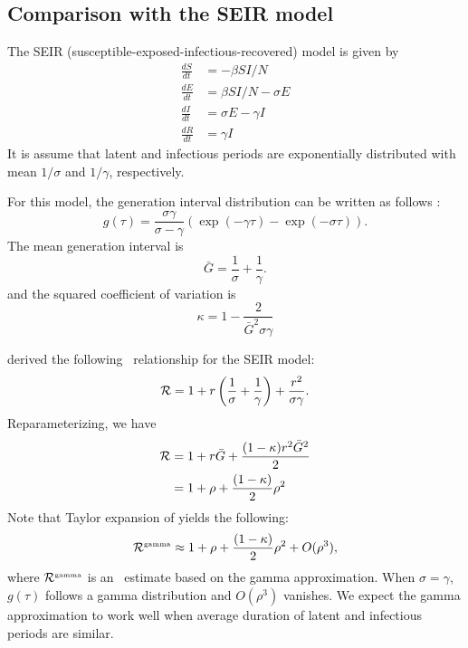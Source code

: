 
\subsection{Comparison with the SEIR model}

The SEIR (susceptible-exposed-infectious-recovered) model is given by
\begin{equation}
\begin{aligned}
\frac{dS}{dt} &= - \beta SI/N\\
\frac{dE}{dt} &= \beta SI/N - \sigma E\\
\frac{dI}{dt} &= \sigma E - \gamma I\\
\frac{dR}{dt} &= \gamma I
\end{aligned}
\end{equation}
It is assume that latent and infectious periods are exponentially distributed with mean $1/\sigma$ and $1/\gamma$, respectively.

For this model, the generation interval distribution can be written as follows \cite{Sven07}:
\begin{equation}
g({\tau}) = \frac{\sigma \gamma}{\sigma - \gamma} \left(\exp (-\gamma \tau) - \exp (- \sigma \tau) \right).
\end{equation}
The mean generation interval is
\begin{equation}
\bar{G} = \frac{1}{\sigma} + \frac{1}{\gamma}.
\end{equation}
and the squared coefficient of variation is
\begin{equation}
\kappa = 1 - \frac{2}{\bar{G}^2 \sigma \gamma}
\end{equation}

\cite{lipsitch2003transmission, roberts2007model} derived the following \rR\ relationship for the SEIR model:
\begin{equation}
{\cal R} = 1 + r\left(\frac{1}{\sigma} + \frac{1}{\gamma} \right) + \frac{r^2}{\sigma \gamma}.
\end{equation}
Reparameterizing, we have 
\begin{equation}
\begin{aligned}
{\cal R} &= 1 + r \bar{G} + \frac{(1-\kappa) r^2 {\bar{G}}^2}{2}\\
&= 1 + \rho + \frac{(1-\kappa)}{2} \rho^2
\end{aligned}
\end{equation}
Note that Taylor expansion of  yields the following:
\begin{equation}
{\cal R}^{{\textrm{\tiny gamma}}} \approx 1 + \rho + \frac{(1-\kappa)}{2} \rho^2 + O(\rho^3) \label{eq:taylor},
\end{equation}
where ${\cal R}^{{\textrm{\tiny gamma}}}$ is an \RR\ estimate based on the gamma approximation.
When $\sigma = \gamma$, $g(\tau)$ follows a gamma distribution and $O(\rho^3)$ vanishes.
We expect the gamma approximation to work well when average duration of latent and infectious periods are similar.

